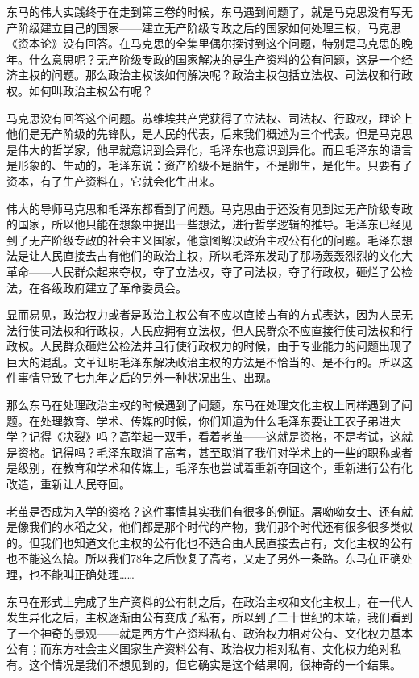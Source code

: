 \documentclass[UTF8, 12pt, a4paper]{ctexrep}
\begin{document}
东马的伟大实践终于在走到第三卷的时候，东马遇到问题了，就是马克思没有写无产阶级建立自己的国家——建立无产阶级专政之后的国家如何处理三权，马克思《资本论》没有回答。在马克思的全集里偶尔探讨到这个问题，特别是马克思的晚年。什么意思呢？无产阶级专政的国家解决的是生产资料的公有问题，这是一个经济主权的问题。那么政治主权该如何解决呢？政治主权包括立法权、司法权和行政权。如何叫政治主权公有呢？

马克思没有回答这个问题。苏维埃共产党获得了立法权、司法权、行政权，理论上他们是无产阶级的先锋队，是人民的代表，后来我们概述为三个代表。但是马克思是伟大的哲学家，他早就意识到会异化，毛泽东也意识到异化。而且毛泽东的语言是形象的、生动的，毛泽东说：资产阶级不是胎生，不是卵生，是化生。只要有了资本，有了生产资料在，它就会化生出来。

伟大的导师马克思和毛泽东都看到了问题。马克思由于还没有见到过无产阶级专政的国家，所以他只能在想象中提出一些想法，进行哲学逻辑的推导。毛泽东已经见到了无产阶级专政的社会主义国家，他意图解决政治主权公有化的问题。毛泽东想法是让人民直接去占有他们的政治主权，所以毛泽东发动了那场轰轰烈烈的文化大革命——人民群众起来夺权，夺了立法权，夺了司法权，夺了行政权，砸烂了公检法，在各级政府建立了革命委员会。

显而易见，政治权力或者是政治主权公有不应以直接占有的方式表达，因为人民无法行使司法权和行政权，人民应拥有立法权，但人民群众不应直接行使司法权和行政权。人民群众砸烂公检法并且行使行政权力的时候，由于专业能力的问题出现了巨大的混乱。文革证明毛泽东解决政治主权的方法是不恰当的、是不行的。所以这件事情导致了七九年之后的另外一种状况出生、出现。

那么东马在处理政治主权的时候遇到了问题，东马在处理文化主权上同样遇到了问题。在处理教育、学术、传媒的时候，你们知道为什么毛泽东要让工农子弟进大学？记得《决裂》吗？高举起一双手，看着老茧——这就是资格，不是考试，这就是资格。记得吗？毛泽东取消了高考，甚至取消了我们对学术上的一些的职称或者是级别，在教育和学术和传媒上，毛泽东也尝试着重新夺回这个，重新进行公有化改造，重新让人民夺回。

老茧是否成为入学的资格？这件事情其实我们有很多的例证。屠呦呦女士、还有就是像我们的水稻之父，他们都是那个时代的产物，我们那个时代还有很多很多类似的。但我们也知道文化主权的公有化也不适合由人民直接去占有，文化主权的公有也不能这么搞。所以我们78年之后恢复了高考，又走了另外一条路。东马在正确处理，也不能叫正确处理……

东马在形式上完成了生产资料的公有制之后，在政治主权和文化主权上，在一代人发生异化之后，主权逐渐由公有变成了私有，所以到了二十世纪的末端，我们看到了一个神奇的景观——就是西方生产资料私有、政治权力相对公有、文化权力基本公有；而东方社会主义国家生产资料公有、政治权力相对私有、文化权力绝对私有。这个情况是我们不想见到的，但它确实是这个结果啊，很神奇的一个结果。
\end{document}
